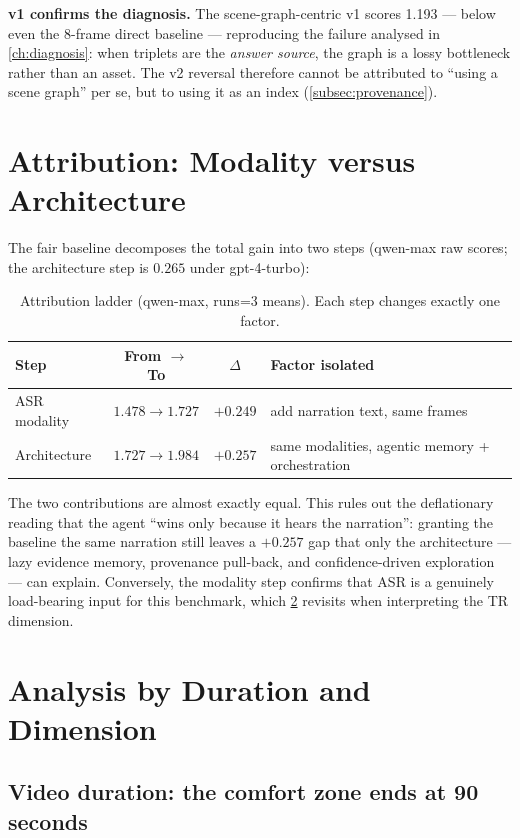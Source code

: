 \textbf{v1 confirms the diagnosis.} The scene-graph-centric v1 scores 1.193 ---
below even the 8-frame direct baseline --- reproducing the failure analysed in
\cref{ch:diagnosis}: when triplets are the \emph{answer source}, the graph is a
lossy bottleneck rather than an asset. The v2 reversal therefore cannot be
attributed to ``using a scene graph'' per se, but to using it as an index
(\cref{subsec:provenance}).

\section{Attribution: Modality versus Architecture}
\label{sec:attribution}

The fair baseline decomposes the total gain into two steps (qwen-max raw scores;
the architecture step is $0.265$ under gpt-4-turbo):

\begin{table}[h]
  \centering
  \small
  \caption{Attribution ladder (qwen-max, runs=3 means). Each step changes exactly
  one factor.}
  \label{tab:attribution}
  \begin{tabular}{@{}lccl@{}}
    \toprule
    Step & From $\to$ To & $\Delta$ & Factor isolated \\
    \midrule
    ASR modality & $1.478 \to 1.727$ & $+0.249$ & add narration text, same frames \\
    Architecture & $1.727 \to 1.984$ & $+0.257$ & same modalities, agentic memory + orchestration \\
    \bottomrule
  \end{tabular}
\end{table}

The two contributions are almost exactly equal. This rules out the deflationary
reading that the agent ``wins only because it hears the narration'': granting the
baseline the same narration still leaves a $+0.257$ gap that only the architecture
--- lazy evidence memory, provenance pull-back, and confidence-driven exploration
--- can explain. Conversely, the modality step confirms that ASR is a genuinely
load-bearing input for this benchmark, which \cref{sec:analysis} revisits when
interpreting the TR dimension.

\section{Analysis by Duration and Dimension}
\label{sec:analysis}

\subsection{Video duration: the comfort zone ends at 90 seconds}
\label{subsec:duration}

